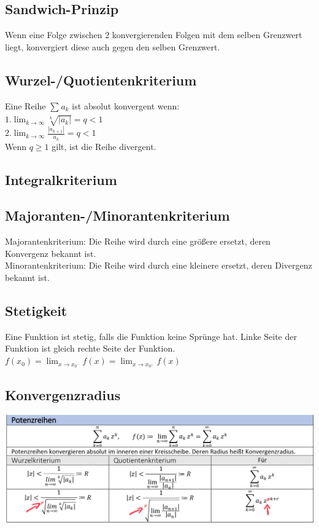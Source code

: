 \documentclass[12pt,a4paper]{article}
\begin{document}
	\subsection{Sandwich-Prinzip}
		Wenn eine Folge zwischen 2 konvergierenden Folgen mit dem selben Grenzwert liegt, konvergiert diese auch gegen den selben Grenzwert.

	\subsection{Wurzel-/Quotientenkriterium}
		Eine Reihe $ \sum_{}^{} a_k  $ ist absolut konvergent wenn:\\
		$1. \lim_{k \to \infty} \sqrt[k]{|a_k|}  = q < 1$\\
		$2. \lim_{k \to \infty} \frac{|a_{k+1}|}{a_k}  = q < 1$\\
		Wenn $q \geqslant 1$ gilt, ist die Reihe divergent.
		
	\subsection{Integralkriterium}
		

	\subsection{Majoranten-/Minorantenkriterium}
		Majorantenkriterium: Die Reihe wird durch eine größere ersetzt, deren Konvergenz bekannt ist.\\
		Minorantenkriterium: Die Reihe wird durch eine kleinere ersetzt, deren Divergenz bekannt ist.

	\subsection{Stetigkeit}
		Eine Funktion ist stetig, falls die Funktion keine Sprünge hat. 
		Linke Seite der Funktion ist gleich rechte Seite der Funktion.\\
		$f(x_0) = \lim_{x \to x_{0^-}} f(x) = \lim_{x \to x_{0^+}} f(x) $ \\
	
	\subsection{Konvergenzradius}
		\includegraphics[scale=0.3]{Bilder/Konvergenzradius.jpg}
\end{document}
